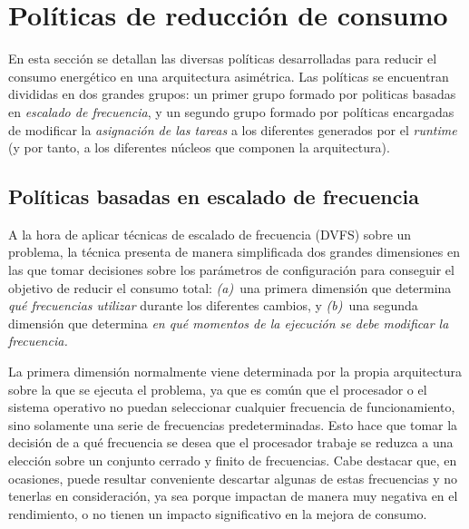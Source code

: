 


\section{Políticas de reducción de consumo}
En esta sección se detallan las diversas políticas desarrolladas para
reducir el consumo energético en una arquitectura asimétrica. Las políticas
se encuentran divididas en dos grandes grupos: un primer grupo formado por
politicas basadas en {\em escalado de frecuencia}, y un segundo grupo
formado por políticas encargadas de modificar la {\em asignación de las
  tareas} a los diferentes \wts generados por el \emph{runtime} (y por
tanto, a los diferentes núcleos que componen la arquitectura).

\subsection[{Políticas basadas en escalado de frecuencia (P1, P2, P2' y P3)}]{Políticas basadas en escalado de frecuencia}

A la hora de aplicar técnicas de escalado de frecuencia (DVFS) sobre un
problema, la técnica presenta de manera simplificada dos grandes
dimensiones en las que tomar decisiones sobre los parámetros de
configuración para conseguir el objetivo de reducir el consumo total: {\em
  (a)}~una primera dimensión que determina {\em qué frecuencias utilizar}
durante los diferentes cambios, y {\em (b)}~una segunda dimensión que
determina \emph{en qué momentos de la ejecución se debe modificar la
  frecuencia.}

La primera dimensión normalmente viene determinada por la propia
arquitectura sobre la que se ejecuta el problema, ya que es común que el
procesador o el sistema operativo no puedan seleccionar cualquier
frecuencia de funcionamiento, sino solamente una serie de frecuencias
predeterminadas. Esto hace que tomar la decisión de a qué frecuencia se
desea que el procesador trabaje se reduzca a una elección sobre un conjunto
cerrado y finito de frecuencias. Cabe destacar que, en ocasiones, puede
resultar conveniente descartar algunas de estas frecuencias y no tenerlas
en consideración, ya sea porque impactan de manera muy negativa en el
rendimiento, o no tienen un impacto significativo en la mejora de
consumo.

